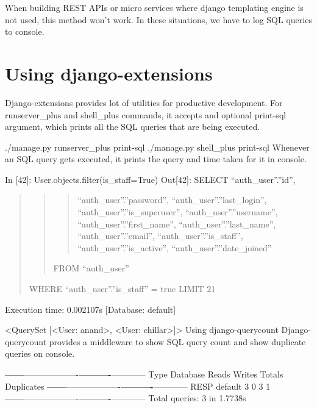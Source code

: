 \documentclass[a5paper,10pt,english]{sphinxmanual}
\begin{document}
When building REST APIs or micro services where django templating engine is not used, this method won’t work. In these situations, we have to log SQL queries to console.


\section{Using django-extensions}
\label{\detokenize{orm_log_sql:using-django-extensions}}
Django-extensions provides lot of utilities for productive development. For runserver\_plus and shell\_plus commands, it accepts and optional \textendash{}print-sql argument, which prints all the SQL queries that are being executed.

./manage.py runserver\_plus \textendash{}print-sql
./manage.py shell\_plus \textendash{}print-sql
Whenever an SQL query gets executed, it prints the query and time taken for it in console.

In {[}42{]}: User.objects.filter(is\_staff=True)
Out{[}42{]}: SELECT “auth\_user”.”id”,
\begin{quote}
\begin{quote}
\begin{quote}

“auth\_user”.”password”,
“auth\_user”.”last\_login”,
“auth\_user”.”is\_superuser”,
“auth\_user”.”username”,
“auth\_user”.”first\_name”,
“auth\_user”.”last\_name”,
“auth\_user”.”email”,
“auth\_user”.”is\_staff”,
“auth\_user”.”is\_active”,
“auth\_user”.”date\_joined”
\end{quote}

FROM “auth\_user”
\end{quote}

WHERE “auth\_user”.”is\_staff” = true
LIMIT 21
\end{quote}

Execution time: 0.002107s {[}Database: default{]}

\textless{}QuerySet {[}\textless{}User: anand\textgreater{}, \textless{}User: chillar\textgreater{}{]}\textgreater{}
Using django-querycount
Django-querycount provides a middleware to show SQL query count and show duplicate queries on console.

{\color{red}\bfseries{}\textbar{}------\textbar{}}———\textendash{}{\color{red}\bfseries{}\textbar{}----------\textbar{}}———-{\color{red}\bfseries{}\textbar{}----------\textbar{}}————\textbar{}
\textbar{} Type \textbar{} Database  \textbar{}   Reads  \textbar{}  Writes  \textbar{}  Totals  \textbar{} Duplicates \textbar{}
{\color{red}\bfseries{}\textbar{}------\textbar{}}———\textendash{}{\color{red}\bfseries{}\textbar{}----------\textbar{}}———-{\color{red}\bfseries{}\textbar{}----------\textbar{}}————\textbar{}
\textbar{} RESP \textbar{}  default  \textbar{}    3     \textbar{}    0     \textbar{}    3     \textbar{}     1      \textbar{}
{\color{red}\bfseries{}\textbar{}------\textbar{}}———\textendash{}{\color{red}\bfseries{}\textbar{}----------\textbar{}}———-{\color{red}\bfseries{}\textbar{}----------\textbar{}}————\textbar{}
Total queries: 3 in 1.7738s
\end{document}
